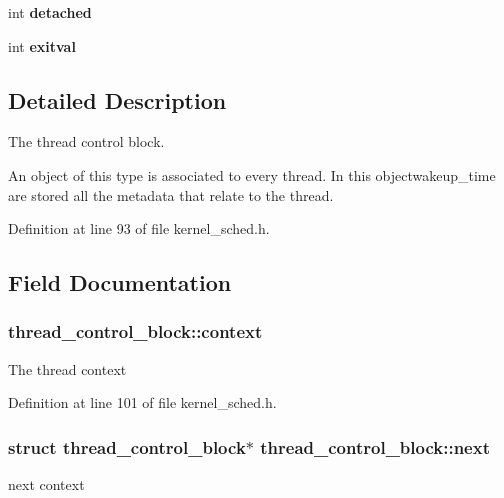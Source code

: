 \begin{DoxyCompactItemize}
\item 
int {\bfseries detached}\hypertarget{structthread__control__block_a6600a9623cf64758cd190d9ddd5549bf}{}\label{structthread__control__block_a6600a9623cf64758cd190d9ddd5549bf}

\item 
int {\bfseries exitval}\hypertarget{structthread__control__block_a59463eb8dfdfc17e0a2cc71c8ae3a1b7}{}\label{structthread__control__block_a59463eb8dfdfc17e0a2cc71c8ae3a1b7}

\end{DoxyCompactItemize}


\subsection{Detailed Description}
The thread control block. 

An object of this type is associated to every thread. In this objectwakeup\+\_\+time are stored all the metadata that relate to the thread. 

Definition at line 93 of file kernel\+\_\+sched.\+h.



\subsection{Field Documentation}
\subsubsection[{\texorpdfstring{context}{context}}]{ thread\+\_\+control\+\_\+block\+::context}\hypertarget{structthread__control__block_a9c107039dffa851dde6edabd6cd3f89c}{}\label{structthread__control__block_a9c107039dffa851dde6edabd6cd3f89c}
The thread context 

Definition at line 101 of file kernel\+\_\+sched.\+h.

\subsubsection[{\texorpdfstring{next}{next}}]{\setlength{\rightskip}{0pt plus 5cm}struct {\bf thread\+\_\+control\+\_\+block}$\ast$ thread\+\_\+control\+\_\+block\+::next}\hypertarget{structthread__control__block_ac6b51ca735291f730ca1d4c335fb9359}{}\label{structthread__control__block_ac6b51ca735291f730ca1d4c335fb9359}
next context 

